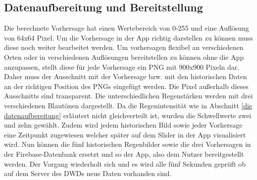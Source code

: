 \subsection{Datenaufbereitung und Bereitstellung}
Die berechnete Vorhersage hat einen Wertebereich von 0-255 und eine Auflösung von 64x64 Pixel.
Um die Vorhersage in der App richtig darstellen zu können muss diese noch weiter bearbeitet werden.
Um vorhersagen flexibel an verschiedenen Orten oder in verschiedenen Auflösungen bereitstellen zu können ohne die App anzupassen, stellt diese für jede Vorhersage ein PNG mit 900x900 Pixeln dar.
Daher muss der Ausschnitt mit der Vorhersage bzw. mit den historischen Daten an der richtigen Position des PNGs eingefügt werden.
Die Pixel außerhalb dieses Ausschnitts sind transparent.
Die unterschiedlichen Regenstärken werden mit drei verschiedenen Blautönen dargestellt.
Da die Regenintensität wie in Abschnitt \ref{die datenaufbereitung} erläutert nicht gleichverteilt ist, wurden die Schwellwerte zwei und zehn gewählt. 
Zudem wird jedem historischen Bild sowie jeder Vorhersage eine Zeitpunkt zugewiesen welcher später auf dem Slider in der App visualisiert wird.
Nun können die fünf historischen Regenbilder sowie die drei Vorhersagen in der Firebase-Datenbank ersetzt und so der App, also dem Nutzer bereitgestellt werden. 
Der Vorgang wiederholt sich und es wird alle fünf Sekunden geprüft ob auf dem Server des DWDs neue Daten vorhanden sind. 

